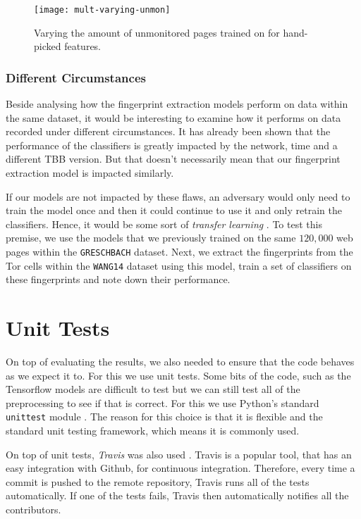 \begin{figure}[ht]
  \centering
  \texttt{[image: mult-varying-unmon]}
  \caption{Varying the amount of unmonitored pages trained on for hand-picked features.}
  \label{fig:mult-varying-unmon}
\end{figure}

\subsubsection{Different Circumstances}

Beside analysing how the fingerprint extraction models perform on data within the same dataset, it would be interesting to examine how it performs on data recorded under different circumstances.
It has already been shown that the performance of the classifiers is greatly impacted by the network, time and a different TBB version.
But that doesn't necessarily mean that our fingerprint extraction model is impacted similarly.

If our models are not impacted by these flaws, an adversary would only need to train the model once and then it could continue to use it and only retrain the classifiers.
Hence, it would be some sort of \textit{transfer learning}
.
To test this premise, we use the models that we previously trained on the same $120,000$ web pages within the \texttt{GRESCHBACH} dataset.
Next, we extract the fingerprints from the Tor cells within the \texttt{WANG14} dataset using this model, train a set of classifiers on these fingerprints and note down their performance.



\section{Unit Tests}

On top of evaluating the results, we also needed to ensure that the code behaves as we expect it to.
For this we use unit tests.
Some bits of the code, such as the Tensorflow models are difficult to test but we can still test all of the preprocessing to see if that is correct.
For this we use Python's standard \texttt{unittest} module \cite{python_unittest_documentation}.
The reason for this choice is that it is flexible and the standard unit testing framework, which means it is commonly used.

On top of unit tests, \textit{Travis} was also used \cite{travis}.
Travis is a popular tool, that has an easy integration with Github, for continuous integration.
Therefore, every time a commit is pushed to the remote repository, Travis runs all of the tests automatically.
If one of the tests fails, Travis then automatically notifies all the contributors.


